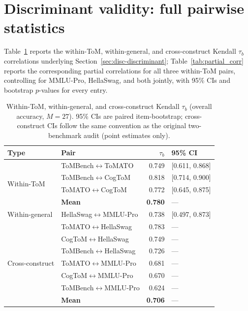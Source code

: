 \documentclass{article} %
\begin{document}
\section{Discriminant validity: full pairwise statistics}
\label{app:discriminant}
 
Table~\ref{tab:within_cross} reports the within-ToM, within-general, and cross-construct Kendall $\tau_b$ correlations underlying Section~\ref{sec:disc-discriminant}; Table~\ref{tab:partial_corr} reports the corresponding partial correlations for all three within-ToM pairs, controlling for MMLU-Pro, HellaSwag, and both jointly, with 95\% CIs and bootstrap $p$-values for every entry.
 
\begin{table}[h]
\centering
\small
\caption{Within-ToM, within-general, and cross-construct Kendall $\tau_b$ (overall accuracy, $M=27$). 95\% CIs are paired item-bootstrap; cross-construct CIs follow the same convention as the original two-benchmark audit (point estimates only).}
\label{tab:within_cross}
\begin{tabular}{llrl}
\toprule
Type & Pair & $\tau_b$ & 95\% CI \\
\midrule
\multirow{4}{*}{Within-ToM}
 & ToMBench$\leftrightarrow$ToMATO & 0.749 & [0.611, 0.868] \\
 & ToMBench$\leftrightarrow$CogToM & 0.818 & [0.714, 0.900] \\
 & ToMATO$\leftrightarrow$CogToM   & 0.772 & [0.645, 0.875] \\
 & \textbf{Mean}                   & \textbf{0.780} & --- \\
\midrule
Within-general & HellaSwag$\leftrightarrow$MMLU-Pro & 0.738 & [0.497, 0.873] \\
\midrule
\multirow{7}{*}{Cross-construct}
 & ToMATO$\leftrightarrow$HellaSwag  & 0.783 & --- \\
 & CogToM$\leftrightarrow$HellaSwag  & 0.749 & --- \\
 & ToMBench$\leftrightarrow$HellaSwag & 0.726 & --- \\
 & ToMATO$\leftrightarrow$MMLU-Pro    & 0.681 & --- \\
 & CogToM$\leftrightarrow$MMLU-Pro    & 0.670 & --- \\
 & ToMBench$\leftrightarrow$MMLU-Pro  & 0.624 & --- \\
 & \textbf{Mean}                      & \textbf{0.706} & --- \\
\bottomrule
\end{tabular}
\end{table}
 
\end{document}
